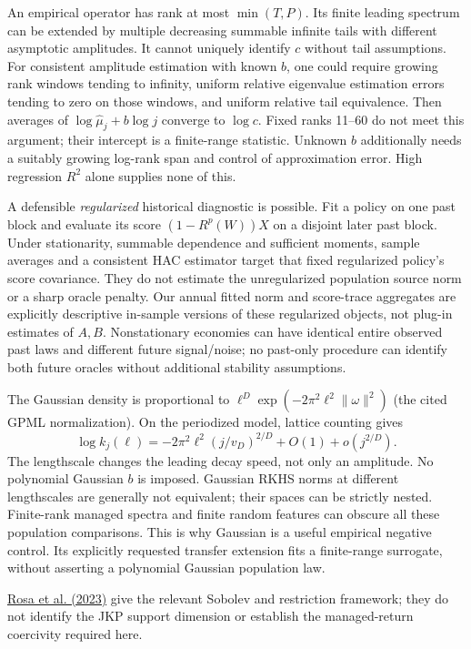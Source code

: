 \documentclass[11pt,letterpaper]{article}
\begin{document}
An empirical operator has rank at most $\min(T,P)$. Its finite leading spectrum
can be extended by multiple decreasing summable infinite tails with different
asymptotic amplitudes. It cannot uniquely identify $c$ without tail assumptions.
For consistent amplitude estimation with known $b$, one could require growing
rank windows tending to infinity, uniform relative eigenvalue estimation errors
tending to zero on those windows, and uniform relative tail equivalence.
Then averages of $\log\widehat\mu_j+b\log j$ converge to $\log c$.
Fixed ranks 11--60 do not meet this argument; their intercept is a finite-range
statistic. Unknown $b$ additionally needs a suitably growing log-rank span and
control of approximation error. High regression $R^2$ alone supplies none of this.

A defensible \emph{regularized} historical diagnostic is possible. Fit a policy
on one past block and evaluate its score $(1-R^p(W))X$ on a disjoint later past
block. Under stationarity, summable dependence and sufficient moments, sample
averages and a consistent HAC estimator target that fixed regularized policy's
score covariance. They do not estimate the unregularized population source norm
or a sharp oracle penalty. Our annual fitted norm and score-trace aggregates are
explicitly descriptive in-sample versions of these regularized objects, not
plug-in estimates of $A,B$. Nonstationary economies can have identical entire
observed past laws and different future signal/noise; no past-only procedure can
identify both future oracles without additional stability assumptions.

The Gaussian density is proportional to
$\ell^D\exp(-2\pi^2\ell^2\|\omega\|^2)$ (the cited GPML normalization).
On the periodized model, lattice counting gives
\[
 \log k_j(\ell)=-2\pi^2\ell^2(j/v_D)^{2/D}+O(1)+o(j^{2/D}).
\]
The lengthscale changes the leading decay speed, not only an amplitude.
No polynomial Gaussian $b$ is imposed. Gaussian RKHS norms at different
lengthscales are generally not equivalent; their spaces can be strictly nested.
Finite-rank managed spectra and finite random features can obscure all these
population comparisons. This is why Gaussian is a useful empirical negative
control. Its explicitly requested transfer extension fits a finite-range surrogate,
without asserting a polynomial Gaussian population law.

\href{https://arxiv.org/abs/2309.10918}{Rosa et al. (2023)} give the relevant
Sobolev and restriction framework; they do not identify the JKP support dimension
or establish the managed-return coercivity required here.
\end{document}
